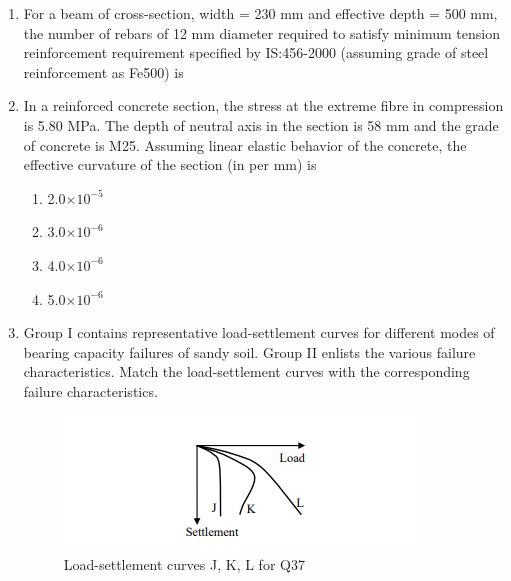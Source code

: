 \documentclass[journal,12pt,onecolumn]{IEEEtran}
\theoremstyle{remark}
\begin{document}
\begin{enumerate}
\begin{multicols}{4}
\begin{enumerate}
\item 30.33 and 20.00
\item 30.33 and 25.00
\item 33.33 and 20.00
\item 33.33 and 25.00
\end{enumerate}
\end{multicols}

\item For a beam of cross-section, width = 230 mm and effective depth = 500 mm, the number of rebars of 12 mm diameter required to satisfy minimum tension reinforcement requirement specified by IS:456-2000 (assuming grade of steel reinforcement as Fe500) is \hfill{}

\item In a reinforced concrete section, the stress at the extreme fibre in compression is 5.80 MPa. The depth of neutral axis in the section is 58 mm and the grade of concrete is M25. Assuming linear elastic behavior of the concrete, the effective curvature of the section (in per mm) is \hfill{}

\begin{multicols}{4}
\begin{enumerate}
\item 2.0$\times 10^{-5}$
\item 3.0$\times 10^{-6}$
\item 4.0$\times 10^{-6}$
\item 5.0$\times 10^{-6}$
\end{enumerate}
\end{multicols}





\item Group I contains representative load-settlement curves for different modes of bearing capacity failures of sandy soil. Group II enlists the various failure characteristics. Match the load-settlement curves with the corresponding failure characteristics. \hfill{}

\begin{figure}[H]
\centering
\includegraphics[width=0.4\linewidth]{figs/image13.png}
\caption{Load-settlement curves J, K, L for Q37}
\label{fig:q37}
\end{figure}


\end{enumerate}
\end{document}

